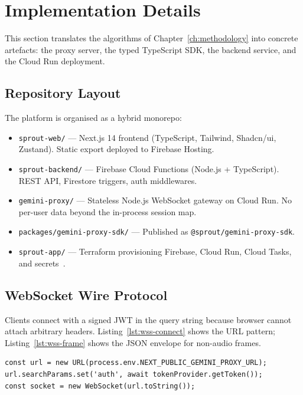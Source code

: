 \chapter{Implementation Details}
\label{ch:implementation}

This section translates the algorithms of Chapter~\ref{ch:methodology} into concrete artefacts: the proxy server, the typed TypeScript SDK, the backend service, and the Cloud Run deployment.

\section{Repository Layout}
\label{sec:repo}

The platform is organised as a hybrid monorepo:
\begin{itemize}
    \item \texttt{sprout-web/} --- Next.js 14 frontend (TypeScript, Tailwind, Shadcn/ui, Zustand). Static export deployed to Firebase Hosting.
    \item \texttt{sprout-backend/} --- Firebase Cloud Functions (Node.js + TypeScript). REST API, Firestore triggers, auth middlewares.
    \item \texttt{gemini-proxy/} --- Stateless Node.js WebSocket gateway on Cloud Run. No per-user data beyond the in-process session map.
    \item \texttt{packages/gemini-proxy-sdk/} --- Published as \texttt{@sprout/gemini-proxy-sdk}.
    \item \texttt{sprout-app/} --- Terraform provisioning Firebase, Cloud Run, Cloud Tasks, and secrets~\cite{firebase2024,cloudrun2024}.
\end{itemize}

\section{WebSocket Wire Protocol}
\label{sec:wss-protocol}

Clients connect with a signed JWT in the query string because browser  cannot attach arbitrary headers. Listing~\ref{lst:wss-connect} shows the URL pattern; Listing~\ref{lst:wss-frame} shows the JSON envelope for non-audio frames.

\begin{lstlisting}[caption={WebSocket upgrade URL (browser).},label=lst:wss-connect]
const url = new URL(process.env.NEXT_PUBLIC_GEMINI_PROXY_URL);
url.searchParams.set('auth', await tokenProvider.getToken());
const socket = new WebSocket(url.toString());
\end{lstlisting}

